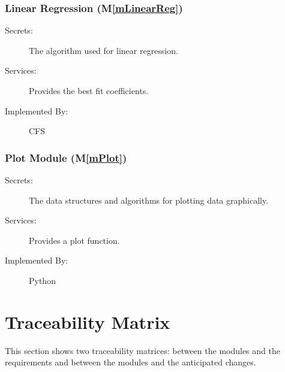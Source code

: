 \documentclass[12pt, titlepage]{article}
\newcommand{\mref}[1]{M\ref{#1}}
\newcommand{\famname}{CFS} %
\begin{document}
\subsubsection{Linear Regression (\mref{mLinearReg})}

\begin{description}
	\item[Secrets:] The algorithm used for linear regression.
	\item[Services:] Provides the best fit coefficients.
	\item[Implemented By:] \famname{}
\end{description}

\subsubsection{Plot Module (\mref{mPlot})}

\begin{description}
	\item[Secrets:] The data structures and algorithms for plotting data graphically.
	\item[Services:] Provides a plot function.
	\item[Implemented By:] Python
\end{description}

\section{Traceability Matrix} \label{SecTM}

This section shows two traceability matrices: between the modules and the
requirements and between the modules and the anticipated changes.
\end{document}

